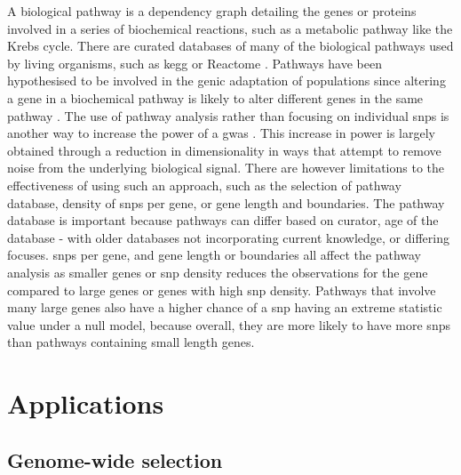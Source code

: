 \documentclass[twoside,openright]{report}
\begin{document}
A biological pathway is a dependency graph detailing the genes or
proteins involved in a series of biochemical reactions, such as a
metabolic pathway like the Krebs cycle. There are curated databases of
many of the biological pathways used by living organisms, such as
\gls{kegg} \citep{Kanehisa2017} or Reactome \citep{Fabregat2018}.
Pathways have been hypothesised to be involved in the genic adaptation
of populations since altering a gene in a biochemical pathway is likely
to alter different genes in the same pathway \citep{Bigham2010}. The use
of pathway analysis rather than focusing on individual \glspl{snp} is
another way to increase the power of a \gls{gwas} \citep{Jia2011}. This
increase in power is largely obtained through a reduction in
dimensionality in ways that attempt to remove noise from the underlying
biological signal. There are however limitations to the effectiveness of
using such an approach, such as the selection of pathway database,
density of \glspl{snp} per gene, or gene length and boundaries. The
pathway database is important because pathways can differ based on
curator, age of the database - with older databases not incorporating
current knowledge, or differing focuses. \Glspl{snp} per gene, and gene
length or boundaries all affect the pathway analysis as smaller genes or
\gls{snp} density reduces the observations for the gene compared to
large genes or genes with high \gls{snp} density. Pathways that involve
many large genes also have a higher chance of a \gls{snp} having an
extreme statistic value under a null model, because overall, they are
more likely to have more \glspl{snp} than pathways containing small
length genes.

\section{Applications}\label{applications}

\subsection{Genome-wide selection}\label{genome-wide-selection}
\end{document}
